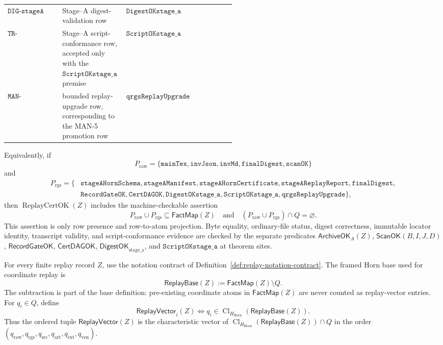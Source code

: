 \documentclass[runningheads]{llncs}
\newcommand{\ScanOK}{\mathsf{ScanOK}}
\newcommand{\RecordGateOK}{\mathsf{RecordGateOK}}
\newcommand{\CertDAGOK}{\mathsf{CertDAGOK}}
\newcommand{\DigestOKstageA}{\mathsf{DigestOK}_{\mathrm{stage\_a}}}
\newcommand{\ArchiveOKA}{\mathsf{ArchiveOK}_{A}}
\newcommand{\FactMap}{\mathsf{FactMap}}
\newcommand{\ReplayVector}{\mathsf{ReplayVector}}
\newcommand{\ReplayBase}{\mathsf{ReplayBase}}
\newcommand{\rawBeginTokenCoord}{q_{\mathrm{raw}}}
\newcommand{\qlex}{\rawBeginTokenCoord}
\newcommand{\qrgs}{q_{\mathrm{rgs}}}
\newcommand{\qsrc}{q_{\mathrm{src}}}
\newcommand{\qart}{q_{\mathrm{art}}}
\newcommand{\qext}{q_{\mathrm{ext}}}
\newcommand{\qven}{q_{\mathrm{ven}}}
\newcommand{\HHorn}{H_{\mathrm{Horn}}}
\newcommand{\ClHHorn}{\operatorname{Cl}_{\HHorn}}
\begin{document}
\begin{definition}
\begin{center}
\begin{tabularx}{0.98\linewidth}{@{}L{0.24\linewidth}L{0.28\linewidth}Y@{}}
\addlinespace
\(\texttt{DIG-stageA}\) &
Stage--A digest-validation row &
\(\texttt{DigestOKstage\_a}\)\\
\addlinespace
\(\texttt{TR-scriptStageA}\) &
Stage--A script-conformance row, accepted only with the
\(\texttt{ScriptOKstage\_a}\) premise &
\(\texttt{ScriptOKstage\_a}\)\\
\addlinespace
\(\texttt{MAN-qrgsUpgrade}\) &
bounded replay-upgrade row, corresponding to the MAN-5 promotion row &
\(\texttt{qrgsReplayUpgrade}\)\\
\bottomrule
\end{tabularx}
\end{center}
Equivalently, if
\[
P_{\mathrm{raw}}=
\{\texttt{mainTex},\texttt{invJson},\texttt{invMd},
\texttt{finalDigest},\texttt{scanOK}\}
\]
and
\[
\begin{aligned}
P_{\mathrm{rgs}}=\{&
\texttt{stageAHornSchema},\texttt{stageAManifest},
\texttt{stageAHornCertificate},\texttt{stageAReplayReport},
\texttt{finalDigest},\\
&\texttt{RecordGateOK},\texttt{CertDAGOK},
\texttt{DigestOKstage\_a},\texttt{ScriptOKstage\_a},
\texttt{qrgsReplayUpgrade}\},
\end{aligned}
\]
then \(\operatorname{ReplayCertOK}(Z)\) includes the machine-checkable assertion
\[
P_{\mathrm{raw}}\cup P_{\mathrm{rgs}}\subseteq\FactMap(Z)
\quad\text{and}\quad
(P_{\mathrm{raw}}\cup P_{\mathrm{rgs}})\cap Q=\varnothing .
\]
This assertion is only row presence and row-to-atom projection.  Byte equality,
ordinary-file status, digest correctness, immutable locator identity, transcript
validity, and script-conformance evidence are checked by the separate predicates
\(\ArchiveOKA(Z)\), \(\ScanOK(B,I,J,D)\), \(\RecordGateOK\), \(\CertDAGOK\),
\(\DigestOKstageA\), and \(\texttt{ScriptOKstage\_a}\) at theorem sites.
\end{definition}

\begin{definition}
\label{def:operative-replay-base}
For every finite replay record \(Z\), use the notation contract of
Definition~\ref{def:replay-notation-contract}.  The framed Horn base used for
coordinate replay is
\[
\ReplayBase(Z):=\FactMap(Z)\setminus Q .
\]
The subtraction is part of the base definition: pre-existing coordinate atoms in
\(\FactMap(Z)\) are never counted as replay-vector entries.  For
\(q_i\in Q\), define
\[
\ReplayVector_i(Z)\Longleftrightarrow
q_i\in\ClHHorn(\ReplayBase(Z)).
\]
Thus the ordered tuple \(\ReplayVector(Z)\) is the characteristic vector of
\(\ClHHorn(\ReplayBase(Z))\cap Q\) in the order
\((\qlex,\qrgs,\qsrc,\qart,\qext,\qven)\).
\end{definition}
\end{document}
